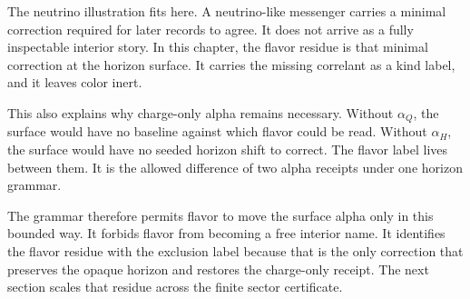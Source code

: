 The neutrino illustration fits here. A neutrino-like messenger carries a
minimal correction required for later records to agree. It does not arrive
as a fully inspectable interior story. In this chapter, the flavor residue
is that minimal correction at the horizon surface. It carries the missing
correlant as a kind label, and it leaves color inert.

This also explains why charge-only alpha remains necessary. Without
\(\alpha_Q\), the surface would have no baseline against which flavor could
be read. Without \(\alpha_H\), the surface would have no seeded horizon
shift to correct. The flavor label lives between them. It is the allowed
difference of two alpha receipts under one horizon grammar.

The grammar therefore permits flavor to move the surface alpha only in this
bounded way. It forbids flavor from becoming a free interior name. It
identifies the flavor residue with the exclusion label because that is the
only correction that preserves the opaque horizon and restores the
charge-only receipt. The next section scales that residue across the finite
sector certificate.
